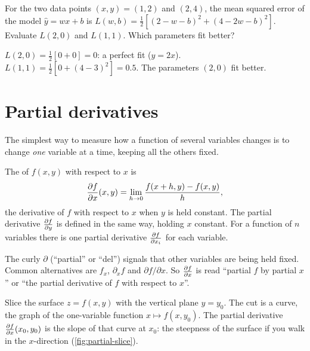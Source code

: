 \begin{exercise}
For the two data points $(x, y) = (1, 2)$ and $(2, 4)$, the mean squared error
of the model $\hat y = wx + b$ is
$L(w, b) = \frac12\left[(2 - w - b)^2 + (4 - 2w - b)^2\right]$. Evaluate
$L(2, 0)$ and $L(1, 1)$. Which parameters fit better?
\end{exercise}
\begin{solution}
$L(2, 0) = \tfrac12[0 + 0] = 0$: a perfect fit ($y = 2x$). $L(1, 1) =
\tfrac12[0 + (4 - 3)^2] = 0.5$. The parameters $(2, 0)$ fit better.
\end{solution}

\section{Partial derivatives}\label{sec:partial-derivatives}

The simplest way to measure how a function of several variables changes is to
change \emph{one} variable at a time, keeping all the others fixed.

\begin{definition}\label{def:partial-derivative}
The  of $f(x, y)$ with respect to $x$ is
\[
  \frac{\partial f}{\partial x}(x, y) = \lim_{h\to0}\frac{f(x + h, y) - f(x, y)}{h},
\]
the derivative of $f$ with respect to $x$ when $y$ is held constant. The
partial derivative $\frac{\partial f}{\partial y}$ is defined in the same way, holding $x$
constant. For a function of $n$ variables there is one partial derivative
$\frac{\partial f}{\partial x_i}$ for each variable.
\end{definition}

\begin{notation}
The curly $\partial$ (``partial'' or ``del'') signals that other variables are
being held fixed. Common alternatives are $f_x$, $\partial_x f$ and
$\partial f/\partial x$. So $\frac{\partial f}{\partial x}$ is read ``partial $f$ by partial
$x$'' or ``the partial derivative of $f$ with respect to $x$''.
\end{notation}

\begin{picturethis}
Slice the surface $z = f(x, y)$ with the vertical plane $y = y_0$. The cut is a
curve, the graph of the one-variable function $x \mapsto f(x, y_0)$. The partial
derivative $\frac{\partial f}{\partial x}(x_0, y_0)$ is the slope of that curve at $x_0$: the
steepness of the surface if you walk in the $x$-direction
(\cref{fig:partial-slice}).
\end{picturethis}

